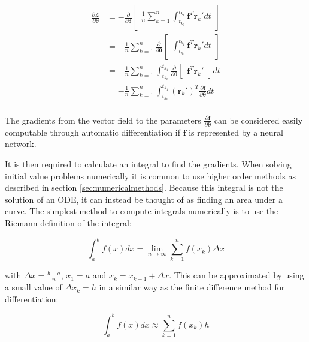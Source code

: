 \documentclass[12pt,a4paper]{book}
\begin{document}
\begin{equation}
    \begin{aligned}
        \frac{\partial \mathcal{L}}{\partial \bm{\theta}}
        &= - \frac{\partial}{\partial \bm{\theta}} \begin{bmatrix} \frac{1}{n} \sum_{k=1}^{n} \int_{t_{k_0}}^{t_{k_1}} \bm{f}^T \bm{r}_k' dt \end{bmatrix} \\
        &= - \frac{1}{n} \sum_{k=1}^{n} \frac{\partial}{\partial \bm{\theta}} \begin{bmatrix} \int_{t_{k_0}}^{t_{k_1}} \bm{f}^T \bm{r}_k' dt \end{bmatrix} \\
        &= - \frac{1}{n} \sum_{k=1}^{n} \int_{t_{k_0}}^{t_{k_1}} \frac{\partial}{\partial \bm{\theta}} \begin{bmatrix} \bm{f}^T \bm{r}_k' \end{bmatrix} dt \\
        &= - \frac{1}{n} \sum_{k=1}^{n} \int_{t_{k_0}}^{t_{k_1}} (\bm{r}_k')^T \frac{\partial \bm{f}}{\partial \bm{\theta}} dt \\
    \end{aligned}
\end{equation}

The gradients from the vector field to the parameters $\frac{\partial \bm{f}}{\partial \bm{\theta}}$ can be considered easily computable through automatic differentiation if $\bm{f}$ is represented by a neural network.

It is then required to calculate an integral to find the gradients. When solving initial value problems numerically it is common to use higher order methods as described in section \ref{sec:numericalmethods}. Because this integral is not the solution of an ODE, it can instead be thought of as finding an area under a curve. The simplest method to compute integrals numerically is to use the Riemann definition of the integral:

\begin{equation}
    \int_a^b f(x) dx = \lim_{n \rightarrow \infty} \sum_{k=1}^{n} f(x_k) \Delta x
\end{equation}

\noindent with $\Delta x = \frac{b - a}{n}$, $x_1 = a$ and $x_k = x_{k-1} + \Delta x$. This can be approximated by using a small value of $\Delta x_k = h$ in a similar way as the finite difference method for differentiation:

\begin{equation}
    \int_a^b f(x) dx \approx \sum_{k=1}^{n} f(x_k) h
\end{equation}
\end{document}
